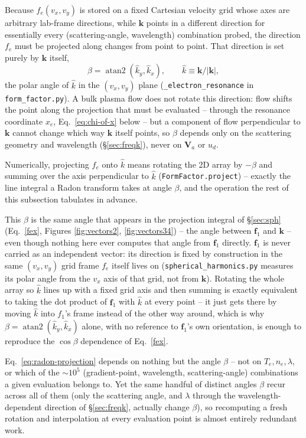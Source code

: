 \documentclass[11pt]{article}
\newcommand{\code}[1]{\texttt{#1}}
\newcommand{\file}[1]{\texttt{#1}}
\begin{document}
Because $f_e(v_x,v_y)$ is stored on a fixed Cartesian velocity grid whose axes are
arbitrary lab-frame directions, while $\mathbf k$ points in a different direction for
essentially every (scattering-angle, wavelength) combination probed, the direction $f_e$
must be projected along changes from point to point. That direction is set purely by
$\mathbf k$ itself,
\begin{equation}\label{eq:beta-def}
  \beta=\operatorname{atan2}(\hat k_y,\hat k_x), \qquad \hat k\equiv\mathbf k/|\mathbf k|,
\end{equation}
the polar angle of $\hat k$ in the $(v_x,v_y)$ plane (\code{\_electron\_resonance} in
\file{form\_factor.py}). A bulk plasma flow does not rotate this direction: flow shifts
the point along the projection that must be evaluated -- through the resonance coordinate
$x_e$, Eq.~\ref{eq:chi-of-x} below -- but a component of flow perpendicular to $\mathbf k$
cannot change which way $\mathbf k$ itself points, so $\beta$ depends only on the
scattering geometry and wavelength (\S\ref{sec:freqk}), never on $\mathbf V_a$ or $u_d$.

Numerically, projecting $f_e$ onto $\hat k$ means rotating the 2D array by $-\beta$ and
summing over the axis perpendicular to $\hat k$ (\code{FormFactor.project}) -- exactly the
line integral a Radon transform takes at angle $\beta$, and the operation the rest of this
subsection tabulates in advance.

This $\beta$ is the same angle that appears in the projection integral of \S\ref{sec:sph}
(Eq.~\ref{fex}, Figures \ref{fig:vectors2}, \ref{fig:vectors34}) -- the angle between
$\mathbf f_1$ and $\mathbf k$ -- even though nothing here ever computes that angle from
$\mathbf f_1$ directly. $\mathbf f_1$ is never carried as an independent vector: its
direction is fixed by construction in the same $(v_x,v_y)$ grid frame $f_e$ itself lives
on (\code{spherical\_harmonics.py} measures its polar angle from the $v_x$ axis of that
grid, not from $\mathbf k$). Rotating the whole array so $\hat k$ lines up with a fixed
grid axis and then summing is exactly equivalent to taking the dot product of $\mathbf f_1$
with $\hat k$ at every point -- it just gets there by moving $\hat k$ into $f_1$'s frame
instead of the other way around, which is why $\beta=\operatorname{atan2}(\hat k_y,\hat
k_x)$ alone, with no reference to $\mathbf f_1$'s own orientation, is enough to reproduce
the $\cos\beta$ dependence of Eq.~\ref{fex}.

Eq.~\ref{eq:radon-projection} depends on nothing but the angle $\beta$ -- not on
$T_e,n_e,\lambda$, or which of the $\sim\!10^5$ (gradient-point, wavelength, scattering-angle)
combinations a given evaluation belongs to. Yet the same handful of distinct angles $\beta$
recur across all of them (only the scattering angle, and $\lambda$ through the
wavelength-dependent direction of \S\ref{sec:freqk}, actually change $\beta$), so
recomputing a fresh rotation and interpolation at every evaluation point is almost entirely
redundant work.
\end{document}
